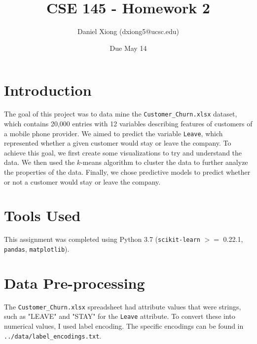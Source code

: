 \documentclass[12pt, notitlepage]{article}
\title{CSE 145 - Homework 2}
\author{Daniel Xiong (dxiong5@ucsc.edu)}
\date{Due May 14}
\begin{document}
\maketitle
\section{Introduction}
The goal of this project was to data mine the \texttt{Customer\_Churn.xlsx} dataset, which contains 20,000 entries with 12 variables describing features of customers of a mobile phone provider. We aimed to predict the variable \texttt{Leave}, which represented whether a given customer would stay or leave the company. To achieve this goal, we first create some visualizations to try and understand the data. We then used the $k$-means algorithm to cluster the data to further analyze the properties of the data. Finally, we chose predictive models to predict whether or not a customer would stay or leave the company.

\section{Tools Used}
This assignment was completed using Python 3.7 (\texttt{scikit-learn} $>=$ 0.22.1, \texttt{pandas}, \texttt{matplotlib}).

\section{Data Pre-processing}
The \texttt{Customer\_Churn.xlsx} spreadsheet had attribute values that were strings, such as "LEAVE" and "STAY" for the \texttt{Leave} attribute. To convert these into numerical values, I used label encoding. The specific encodings can be found in \texttt{../data/label\_encodings.txt}.
\end{document}
